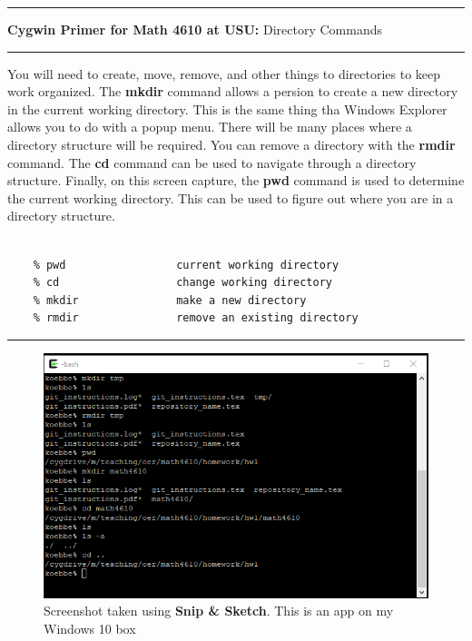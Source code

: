 \documentclass[10pt,fleqn]{article}
\begin{document}
\eject
\vskip0.1in\hrule\vskip0.1in
\noindent
{{\bf Cygwin Primer for Math 4610 at USU:} Directory Commands} 
\vskip0.1in\hrule\vskip0.1in
\noindent
You will need to create, move, remove, and other things to directories to keep
work organized. The {\bf mkdir} command allows a persion to create a new
directory in the current working directory. This is the same thing tha Windows
Explorer allows you to do with a popup menu. There will be many places where
a directory structure will be required. You can remove a directory with the
{\bf rmdir} command. The {\bf cd} command can be used to navigate through a
directory structure. Finally, on this screen capture, the {\bf pwd} command is
used to determine the current working directory. This can be used to figure out
where you are in a directory structure.
\begin{verbatim}

    % pwd                 current working directory
    % cd                  change working directory
    % mkdir               make a new directory
    % rmdir               remove an existing directory

\end{verbatim}
\vskip0.1in\hrule\vskip0.1in
\vfill
\begin{figure}[h]
\centering
\includegraphics{../images/cygwin_03.png}
\caption{{Screenshot} taken using {\bf Snip \& Sketch}. This is an app on
         my Windows 10 box}
\end{figure}
\eject
\end{document}
